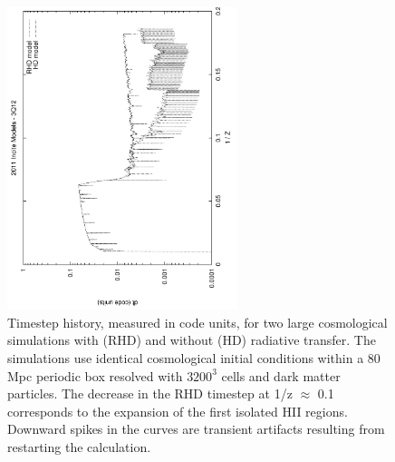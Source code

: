 \begin{figure}[t]
\centerline{\hfill
  \includegraphics[width=0.6\textwidth, angle=-90]{logdt.pdf}
  \hfill}
  \caption{Timestep history, measured in code units, for two large cosmological simulations with (RHD) and without (HD) radiative transfer. The simulations use identical cosmological initial conditions within a 80 Mpc periodic box resolved with $3200^3$ cells and dark matter particles. The decrease in the RHD timestep at 1/z $\approx$ 0.1 corresponds to the expansion of the first isolated HII regions. Downward spikes in the curves are transient artifacts resulting from restarting the calculation.}
  \label{fig:logdt}
\end{figure}




